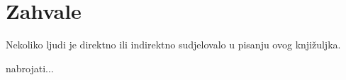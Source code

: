 \chapter*{Zahvale}

Nekoliko ljudi je direktno ili indirektno sudjelovalo u pisanju ovog knjižuljka.

\TODO nabrojati...
